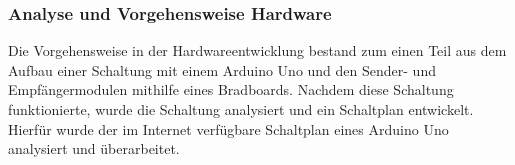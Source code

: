 \subsubsection{Analyse und Vorgehensweise Hardware}
Die Vorgehensweise in der Hardwareentwicklung bestand zum einen Teil aus dem Aufbau einer Schaltung mit einem Arduino Uno und den Sender- und Empfängermodulen mithilfe eines Bradboards. Nachdem diese Schaltung funktionierte, wurde die Schaltung analysiert und ein Schaltplan entwickelt. Hierfür wurde der im Internet verfügbare Schaltplan eines Arduino Uno analysiert und überarbeitet. 
